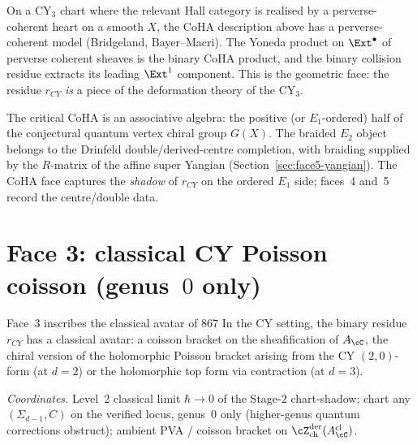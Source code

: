 \begin{remark}
\label{rem:perverse-coherent-sheaves}
On a CY$_3$ chart where the relevant Hall category is realised by a
perverse-coherent heart on a smooth \(X\), the CoHA description above
has a perverse-coherent model (Bridgeland, Bayer--Macri).
The Yoneda product on $\Ext^{\bullet}$ of perverse coherent sheaves is
the binary CoHA product, and the binary collision residue extracts its
leading $\Ext^1$ component. This is the geometric face: the residue
$r_{CY}$ \emph{is} a piece of the deformation theory of the CY$_3$.
\end{remark}

\begin{remark}
\label{rem:coha-not-qvcg}
The critical CoHA is an associative algebra: the positive (or
$E_1$-ordered) half of the conjectural quantum vertex chiral group
$G(X)$. The braided \(E_2\) object belongs to the Drinfeld
double/derived-centre completion, with braiding supplied by the
\(R\)-matrix of the affine super Yangian
(Section~\ref{sec:face5-yangian}). The CoHA face captures the
\emph{shadow} of \(r_{CY}\) on the ordered \(E_1\) side; faces~4 and~5
record the centre/double data.
\end{remark}


\section{Face 3: classical CY Poisson coisson \textup{(}genus~\texorpdfstring{$0$}{0} only\textup{)}}
\label{sec:face3-coisson}

Face~3 inscribes the classical avatar of 867 In the CY setting, the binary
residue $r_{CY}$ has a classical avatar: a coisson bracket on the
sheafification of $A_\cC$, the chiral version of the holomorphic
Poisson bracket arising from the CY $(2{,}0)$-form \textup{(}at
$d = 2$\textup{)} or the holomorphic top form via contraction
\textup{(}at $d = 3$\textup{)}.

\smallskip
\noindent\emph{Coordinates.} Level~$2$ classical limit
$\hbar \to 0$ of the Stage-$2$ chart-shadow; chart any
$(\Sigma_{d-1}, C)$ on the verified locus, genus~$0$ only
\textup{(}higher-genus quantum corrections obstruct\textup{)};
ambient PVA / coisson bracket on
$\cZ^{\mathrm{der}}_{\mathrm{ch}}(A_\cC^{\mathrm{cl}})$.

